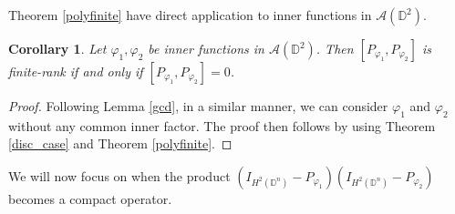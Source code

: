 \documentclass[12pt, a4 paper]{amsart}
\newcommand{\D}{\mathbb{D}}
\theoremstyle{definition}
\theoremstyle{plain}
\newtheorem{cor}[thm]{Corollary}
\theoremstyle{definition}
\numberwithin{equation}{section}
\let\phi=\varphi
\begin{document}
Theorem \ref{polyfinite} have direct application to inner functions in $\mathcal{A}(\D^2)$.
\begin{cor}\label{disc_finite}
Let $\phi_1, \phi_2$ be inner functions in $\mathcal{A}(\D^2)$. Then $[P_{\phi_1}, P_{\phi_2}]$ is finite-rank if and only if $[P_{\phi_1}, P_{\phi_2}] = 0$.
\end{cor}
\begin{proof}
Following Lemma \ref{gcd}, in a similar manner, we can consider $\phi_1$ and $\phi_2$ without any common inner factor. The proof then follows by using Theorem \ref{disc_case} and Theorem \ref{polyfinite}.
\end{proof}

We will now focus on when the product $(I_{H^2(\D^n)} - P_{\phi_1})(I_{H^2(\D^n)}  - P_{\phi_2})$ becomes a compact operator.
 
\end{document}
